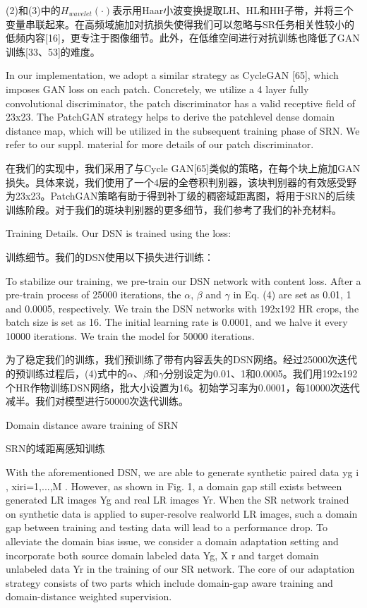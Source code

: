 (2)和(3)中的$H_{wavelet}(\cdot)$表示用Haar小波变换提取LH、HL和HH子带，并将三个变量串联起来。在高频域施加对抗损失使得我们可以忽略与SR任务相关性较小的低频内容[16]，更专注于图像细节。此外，在低维空间进行对抗训练也降低了GAN训练[33、53]的难度。

In our implementation, we adopt a similar strategy as CycleGAN [65], which imposes GAN loss on each patch. Concretely, we utilize a 4 layer fully convolutional discriminator, the patch discriminator has a valid receptive field of 23x23. The PatchGAN strategy helps to derive the patchlevel dense domain distance map, which will be utilized in the subsequent training phase of SRN. We refer to our suppl. material for more details of our patch discriminator.

在我们的实现中，我们采用了与Cycle GAN[65]类似的策略，在每个块上施加GAN损失。具体来说，我们使用了一个4层的全卷积判别器，该块判别器的有效感受野为23x23。PatchGAN策略有助于得到补丁级的稠密域距离图，将用于SRN的后续训练阶段。对于我们的斑块判别器的更多细节，我们参考了我们的补充材料。

Training Details. Our DSN is trained using the loss:

训练细节。我们的DSN使用以下损失进行训练：

To stabilize our training, we pre-train our DSN network with content loss. After a pre-train process of 25000 iterations, the $\alpha$, $\beta$ and $\gamma$ in Eq. (4) are set as 0.01, 1 and 0.0005, respectively. We train the DSN networks with 192x192 HR crops, the batch size is set as 16. The initial learning rate is 0.0001, and we halve it every 10000 iterations. We train the model for 50000 iterations.

为了稳定我们的训练，我们预训练了带有内容丢失的DSN网络。经过25000次迭代的预训练过程后，(4)式中的$\alpha$、$\beta$和$\gamma$分别设定为0.01、1和0.0005。我们用192x192个HR作物训练DSN网络，批大小设置为16。初始学习率为0.0001，每10000次迭代减半。我们对模型进行50000次迭代训练。

Domain distance aware training of SRN

SRN的域距离感知训练

With the aforementioned DSN, we are able to generate synthetic paired data {yg i , xir}i=1,...,M . However, as shown in Fig. 1, a domain gap still exists between generated LR images Yg and real LR images Yr. When the SR network trained on synthetic data is applied to super-resolve realworld LR images, such a domain gap between training and testing data will lead to a performance drop. To alleviate the domain bias issue, we consider a domain adaptation setting and incorporate both source domain labeled data {Yg, X r} and target domain unlabeled data Yr in the training of our SR network. The core of our adaptation strategy consists of two parts which include domain-gap aware training and domain-distance weighted supervision.

